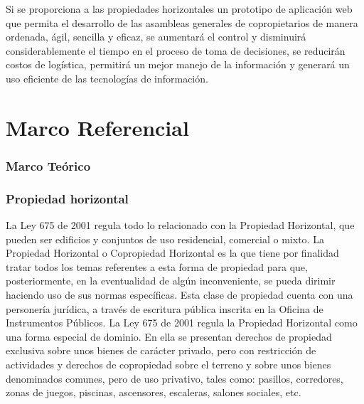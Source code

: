 Si se proporciona a las propiedades horizontales un prototipo de aplicación web que permita el desarrollo de las asambleas generales de copropietarios de manera ordenada, ágil, sencilla y eficaz, se aumentará el control y disminuirá considerablemente el tiempo en el proceso de toma de decisiones, se reducirán costos de logística, permitirá un mejor manejo de la información y generará un uso eficiente de las tecnologías de información.

\section{Marco Referencial}

\subsubsection{Marco Teórico}

\subsubsection{Propiedad horizontal}	

La Ley 675 de 2001 regula todo lo relacionado con la Propiedad Horizontal, que pueden ser edificios y conjuntos de uso residencial, comercial o mixto. La Propiedad Horizontal o Copropiedad Horizontal es la que tiene por finalidad tratar todos los temas referentes a esta forma de propiedad para que, posteriormente, en la eventualidad de algún inconveniente, se pueda dirimir haciendo uso de sus normas específicas.
Esta clase de propiedad cuenta con una personería jurídica, a través de escritura pública inscrita en la Oficina de Instrumentos Públicos.
La Ley 675 de 2001 regula la Propiedad Horizontal como una forma especial de dominio.  En ella se presentan derechos de propiedad exclusiva sobre unos bienes de carácter privado, pero con restricción de actividades y derechos de copropiedad sobre el terreno y sobre unos bienes denominados comunes, pero de uso privativo, tales como: pasillos, corredores, zonas de juegos, piscinas, ascensores, escaleras, salones sociales, etc.\cite{WEB1}

